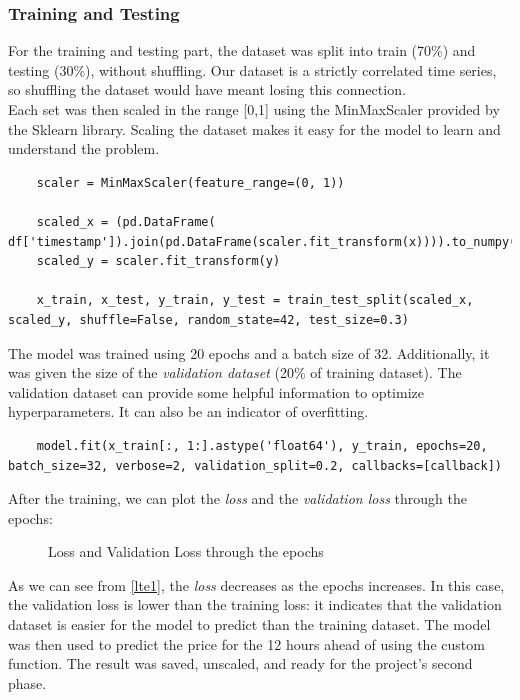 \subsubsection{Training and Testing}
For the training and testing part, the dataset was split into train (70\%) and testing (30\%), without shuffling. Our dataset is a strictly correlated time series, so shuffling the dataset would have meant losing this connection. \\ 
Each set was then scaled in the range [0,1] using the MinMaxScaler provided by the Sklearn library. Scaling the dataset makes it easy for the model to learn and understand the problem.
\begin{verbatim}
    scaler = MinMaxScaler(feature_range=(0, 1))
    
    scaled_x = (pd.DataFrame( df['timestamp']).join(pd.DataFrame(scaler.fit_transform(x)))).to_numpy()
    scaled_y = scaler.fit_transform(y)
    
    x_train, x_test, y_train, y_test = train_test_split(scaled_x, scaled_y, shuffle=False, random_state=42, test_size=0.3)
\end{verbatim}

The model was trained using 20 epochs and a batch size of 32. Additionally, it was given the size of the \textit{validation dataset} (20\% of training dataset). The validation dataset can provide some helpful information to optimize hyperparameters. It can also be an indicator of overfitting.

\begin{verbatim}
    model.fit(x_train[:, 1:].astype('float64'), y_train, epochs=20, batch_size=32, verbose=2, validation_split=0.2, callbacks=[callback])
\end{verbatim}

After the training, we can plot the \textit{loss} and the \textit{validation loss} through the epochs:

\begin{figure}[H]
    \centering
    
    \caption{Loss and Validation Loss through the epochs}
    \label{lte1}
\end{figure}

As we can see from \autoref{lte1}, the \textit{loss} decreases as the epochs increases. In this case, the validation loss is lower than the training loss: it indicates that the validation dataset is easier for the model to predict than the training dataset. The model was then used to predict the price for the 12 hours ahead of using the custom function. The result was saved, unscaled, and ready for the project's second phase.
